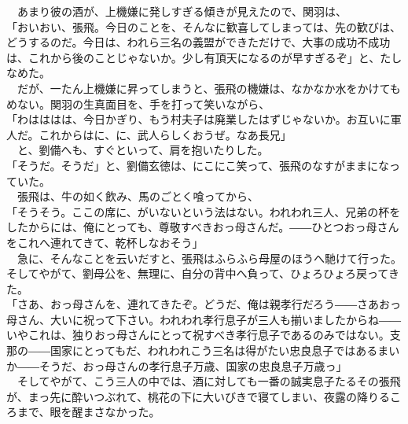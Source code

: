 \documentclass[
  paper=a5,
  fontsize=10pt,
  jafontsize=9.5pt,
  tate,                  %
  open_bracket_pos=nibu, %
]{jlreq}
\begin{document}
　あまり彼の酒が、上機嫌に発しすぎる傾きが見えたので、関羽は、\\


「おいおい、張飛。今日のことを、そんなに歓喜してしまっては、先の歓びは、どうするのだ。今日は、われら三名の義盟ができただけで、大事の成功不成功は、これから後のことじゃないか。少し有頂天になるのが早すぎるぞ」と、たしなめた。\\


　だが、一たん上機嫌に昇ってしまうと、張飛の機嫌は、なかなか水をかけてもめない。関羽の生真面目を、手を打って笑いながら、\\


「わはははは、今日かぎり、もう村夫子は廃業したはずじゃないか。お互いに軍人だ。これからはに、に、武人らしくおうぜ。なあ長兄」\\


　と、劉備へも、すぐといって、肩を抱いたりした。\\


「そうだ。そうだ」と、劉備玄徳は、にこにこ笑って、張飛のなすがままになっていた。\\


　張飛は、牛の如く飲み、馬のごとく喰ってから、\\


「そうそう。ここの席に、がいないという法はない。われわれ三人、兄弟の杯をしたからには、俺にとっても、尊敬すべきおっ母さんだ。――ひとつおっ母さんをこれへ連れてきて、乾杯しなおそう」\\


　急に、そんなことを云いだすと、張飛はふらふら母屋のほうへ馳けて行った。そしてやがて、劉母公を、無理に、自分の背中へ負って、ひょろひょろ戻ってきた。\\


「さあ、おっ母さんを、連れてきたぞ。どうだ、俺は親孝行だろう――さあおっ母さん、大いに祝って下さい。われわれ孝行息子が三人も揃いましたからね――いやこれは、独りおっ母さんにとって祝すべき孝行息子であるのみではない。支那の――国家にとってもだ、われわれこう三名は得がたい忠良息子ではあるまいか――そうだ、おっ母さんの孝行息子万歳、国家の忠良息子万歳っ」\\


　そしてやがて、こう三人の中では、酒に対しても一番の誠実息子たるその張飛が、まっ先に酔いつぶれて、桃花の下に大いびきで寝てしまい、夜露の降りるころまで、眼を醒まさなかった。\\
\end{document}
